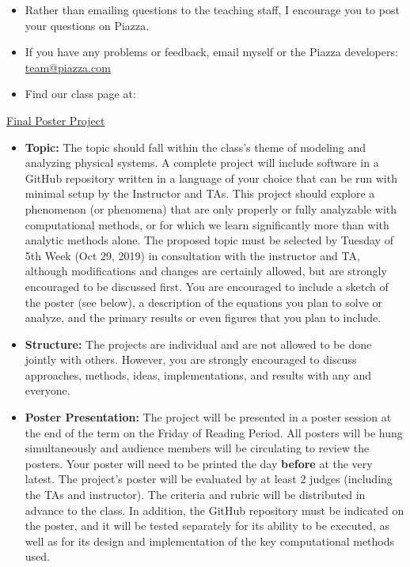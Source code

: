 \begin{itemize}

  \item Rather than emailing questions to the teaching staff, I encourage you to post your questions on Piazza. 

  \item If you have any problems or feedback, email myself or the Piazza developers: \href{mailto:team@piazza.com}{team@piazza.com}

  \item Find our class page at: \PiazzaLink
  
\end{itemize}  


\noindent \underline{Final Poster Project}

\begin{itemize}

  \item \textbf{Topic:} The topic should fall within the class's theme of modeling and analyzing physical systems. A complete project will include software in a GitHub repository written in a language of your choice that can be run with minimal setup by the Instructor and TAs. This project should explore a phenomenon (or phenomena) that are only properly or fully analyzable with computational methods, or for which we learn significantly more than with analytic methods alone. The proposed topic must be selected by Tuesday of 5th Week (Oct 29, 2019) in consultation with the instructor and TA, although modifications and changes are certainly allowed, but are strongly encouraged to be discussed first. You are encouraged to include a sketch of the poster (see below), a description of the equations you plan to solve or analyze, and the primary results or even figures that you plan to include.

  \item \textbf{Structure:} The projects are individual and are not allowed to be done jointly with others. However, you are strongly encouraged to discuss approaches, methods, ideas, implementations, and results with any and everyone.

  \item \textbf{Poster Presentation:} The project will be presented in a poster session at the end of the term on the Friday of Reading Period. All posters will be hung simultaneously and audience members will be circulating to review the posters. Your poster will need to be printed the day \textbf{before} at the very latest. The project's poster will be evaluated by at least 2 judges (including the TAs and instructor). The criteria and rubric will be distributed in advance to the class. In addition, the GitHub repository must be indicated on the poster, and it will be tested separately for its ability to be executed, as well as for its design and implementation of the key computational methods used. 
  
\end{itemize}  


